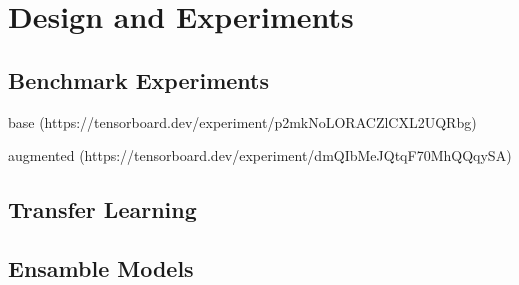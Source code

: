 \chapter{Design and Experiments}

\section{Benchmark Experiments}
base (https://tensorboard.dev/experiment/p2mkNoLORACZlCXL2UQRbg)


augmented (https://tensorboard.dev/experiment/dmQIbMeJQtqF70MhQQqySA)


\section{Transfer Learning}

\section{Ensamble Models}